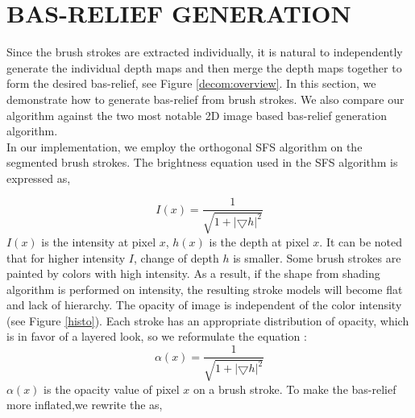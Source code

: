 \section{BAS-RELIEF GENERATION}
Since the brush strokes are extracted individually, it is natural to independently generate the individual depth maps and then merge the depth maps together to form the desired bas-relief, see Figure \ref{decom:overview}. In this section, we demonstrate how to generate bas-relief from brush strokes. We also compare our algorithm against the two most notable 2D image based bas-relief generation algorithm. \\
In our implementation, we employ the orthogonal SFS \cite{prados2004unifying} algorithm on the segmented brush strokes. The brightness equation used in the SFS algorithm is expressed as,

\begin{equation}
I(x)=\frac{1}{\sqrt{1+\left| \bigtriangledown h \right| ^2}}
\end{equation}
$I(x)$ is the intensity at pixel $x$, $h(x)$ is the depth at pixel $x$. It can be noted that for higher intensity $I$, change of depth $h$ is smaller. Some brush strokes are painted by colors with high intensity. As a result, if the shape from shading algorithm is performed on intensity, the resulting stroke models will become flat and lack of hierarchy. The opacity of image is independent of the color intensity (see Figure \ref{histo}). Each stroke has an appropriate distribution of opacity, which is in favor of a layered look, so we reformulate the equation : 
\begin{equation}
\alpha(x)=\frac{1}{\sqrt{1+\left| \bigtriangledown h \right| ^2}}
\end{equation}
$\alpha(x)$ is the opacity value of pixel $x$ on a brush stroke. 
To make the bas-relief more inflated,we rewrite the as,

